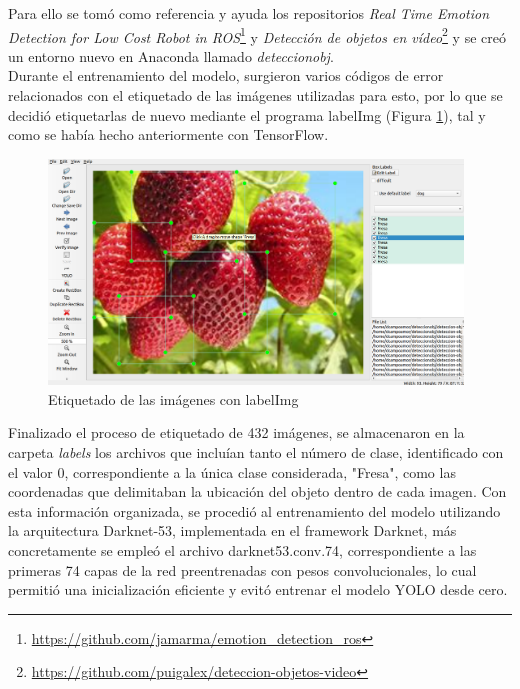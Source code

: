 Para ello se tomó como referencia y ayuda los repositorios \textit{Real Time Emotion Detection for Low Cost Robot in ROS}\footnote{\url{https://github.com/jamarma/emotion_detection_ros}} y \textit{Detección de objetos en vídeo}\footnote{\url{https://github.com/puigalex/deteccion-objetos-video}} y se creó un entorno nuevo en Anaconda llamado \textit{deteccionobj}.\\

Durante el entrenamiento del modelo, surgieron varios códigos de error relacionados con el etiquetado de las imágenes utilizadas para esto, por lo que se decidió etiquetarlas de nuevo mediante el programa labelImg (Figura \ref{fig:labelImg_Fresas}), tal y como se había hecho anteriormente con TensorFlow.

 \begin{figure}[H]
     \centering
     \begin{center}
       \includegraphics[width=11cm]{figs/labelImg Fresa.png}
     \end{center}
     \caption{Etiquetado de las imágenes con labelImg}
    \label{fig:labelImg_Fresas}
  \end{figure}

Finalizado el proceso de etiquetado de 432 imágenes, se almacenaron en la carpeta \textit{labels} los archivos que incluían tanto el número de clase, identificado con el valor 0, correspondiente a la única clase considerada, "Fresa",  como las coordenadas que delimitaban la ubicación del objeto dentro de cada imagen. Con esta información organizada, se procedió al entrenamiento del modelo utilizando la arquitectura Darknet-53, implementada en el framework Darknet, más concretamente se empleó el archivo darknet53.conv.74, correspondiente a las primeras 74 capas de la red preentrenadas con pesos convolucionales, lo cual permitió una inicialización eficiente y evitó entrenar el modelo YOLO desde cero.\\

